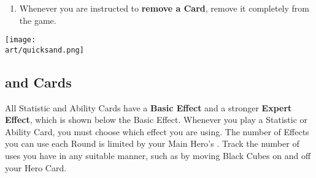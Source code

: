 \begin{multicols}{2}
\begin{enumerate}
  \begin{itemize}
    \item \textbf{Instant}  Effects are resolved immediately.
    \item \textbf{Activation}  Effects must be played when Activating your own Unit in Combat.
    \item \textbf{Map}  Effects cannot be used during Combat.
    \item \textbf{Ongoing}  Effects last until they are used up or until the player who played them starts their next Turn (whichever happens first).
      \begin{expansion}[before skip balanced=0.3em,]{stronghold,conflux,cove}
      \parbox{0.75\hsize}{You can use Time Tokens to track the duration of Ongoing Effects.}
      \end{expansion}
    \item \textbf{Permanent}  Cards stay in play until discarded or replaced.
      They are played the same way as  and  Cards.
      \textbf{You may only have one permanent Card at a time}; playing another discards the first.
      While a Permanent Card is in play, you may use either its Basic or Expert Effect, but not both simultaneously.
  \end{itemize}
  \item Whenever you are instructed to \textbf{remove a Card}, remove it completely from the game.
\end{enumerate}

\vfill
\hfill{\texttt{[image: \\art/quicksand.png]}}

\clearpage

\subsection*{ and  Cards}

All Statistic and Ability Cards have a \textbf{Basic Effect} and a stronger \textbf{Expert}  \textbf{Effect}, which is shown below the Basic Effect.
Whenever you play a Statistic or Ability Card, you must choose which effect you are using.
The number of  Effects you can use each Round is limited by your Main Hero's .
Track the number of uses you have in any suitable manner, such as by moving Black Cubes on and off your Hero Card.\par
\vspace*{\fill}
\columnbreak


\end{multicols}
